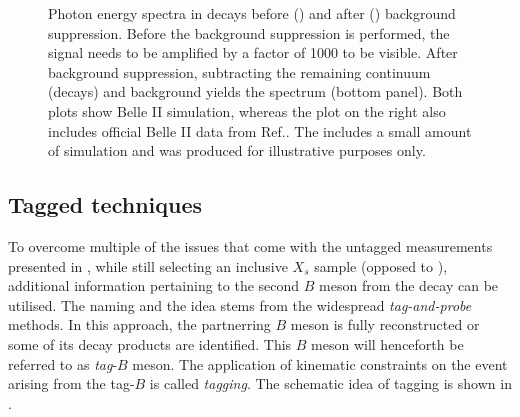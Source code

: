 \begin{figure}[htbp!]
    \centering
    \caption{\label{fig:untagged_btosgamma}Photon energy spectra in \BtoXsgamma decays before () and after () background suppression.
    Before the background suppression is performed, the signal needs to be amplified by a factor of 1000 to be visible.
    After background suppression, subtracting the remaining continuum (\epem\ra\qqbar decays) and \BB background yields the \BtoXsgamma spectrum (bottom panel).
    Both plots show Belle II simulation, whereas the plot on the right also includes official Belle II data from Ref.\cite{Collaboration:2302}.
    The  includes a small amount of simulation and was produced for illustrative purposes only. 
    }
\end{figure}

\subsection{Tagged techniques}\label{sec:had_tagged_overview}

To overcome multiple of the issues that come with the untagged measurements presented in , while still selecting an inclusive $X_s$ sample (opposed to ), 
additional information pertaining to the second $B$ meson from the \FourS decay can be utilised.
The naming and the idea stems from the widespread \textit{tag-and-probe} methods.
In this approach, the partnerring $B$ meson is fully reconstructed or some of its decay products are identified.
This $B$ meson will henceforth be referred to as \textit{tag}-$B$ meson.
The application of kinematic constraints on the event arising from the tag-$B$ is called \textit{tagging}.
The schematic idea of tagging is shown in .

